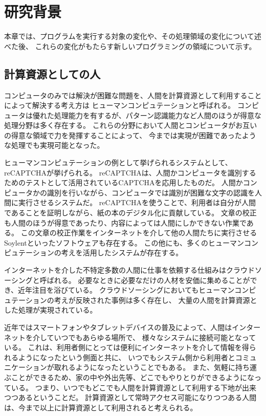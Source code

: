 \chapter{研究背景}\label{chap:background}

本章では、プログラムを実行する対象の変化や、その処理領域の変化について述べた後、
これらの変化がもたらす新しいプログラミングの領域について示す。

\section{計算資源としての人}\label{sec:human-as-computational-resouces}

コンピュータのみでは解決が困難な問題を、人間を計算資源として利用することによって解決する考え方は
ヒューマンコンピュテーション\cite{humancomputation}と呼ばれる。
コンピュータは優れた処理能力を有するが、パターン認識能力など人間のほうが得意な処理分野は多く存在する。
これらの分野において人間とコンピュータがお互いの得意な領域で力を発揮することによって、
今までは実現が困難であったような処理でも実現可能となった。

ヒューマンコンピュテーションの例として挙げられるシステムとして、reCAPTCHA\cite{recaptcha}が挙げられる。
reCAPTCHAは、人間かコンピュータを識別するためのテストとして活用されているCAPTCHA\cite{captcha}を応用したものだ。
人間かコンピュータかの識別を行いながら、コンピュータでは識別が困難な文字の認識を人間に実行させるシステムだ。
reCAPTCHAを使うことで、利用者は自分が人間であることを証明しながら、紙の本のデジタル化に貢献している。
文章の校正も人間のほうが得意であったり、内容によっては人間にしかできない作業である。
この文章の校正作業をインターネットを介して他の人間たちに実行させるSoylent\cite{soylent}といったソフトウェアも存在する。
この他にも、多くのヒューマンコンピュテーションの考えを活用したシステムが存在する。

インターネットを介した不特定多数の人間に仕事を依頼する仕組みはクラウドソーシング\cite{riseofcrowdsourcing}と呼ばれる。
必要なときに必要なだけの人材を安価に集めることができ、近年注目を浴びている。
クラウドソーシングにおいてもヒューマンコンピュテーションの考えが反映された事例は多く存在し、
大量の人間を計算資源とした処理が実現されている。

近年ではスマートフォンやタブレットデバイスの普及によって、人間はインターネットを介していつでもあらゆる場所で、
様々なシステムに接続可能となっている。
これは、利用者側にとっては便利にインターネットを介して情報を得られるようになったという側面と共に、
いつでもシステム側から利用者とコミュニケーションが取れるようになったということでもある。
また、気軽に持ち運ぶことができるため、家の中や外出先等、どこでもやりとりができるようになっている。
つまり、いつでもどこでも人間を計算資源として利用する下地が出来つつあるということだ。
計算資源として常時アクセス可能になりつつある人間は、今まで以上に計算資源として利用されると考えられる。


